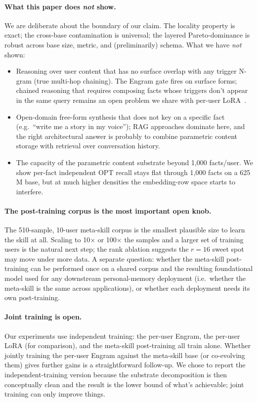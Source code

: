 \documentclass{article}
\begin{document}
\paragraph{What this paper does \emph{not} show.}
We are deliberate about the boundary of our claim. The locality
property is exact; the cross-base contamination is universal; the
layered Pareto-dominance is robust across base size, metric, and
(preliminarily) schema. What we have \emph{not} shown:
\begin{itemize}[leftmargin=*,topsep=2pt,itemsep=2pt]
  \item Reasoning over user content that has no surface overlap with
        any trigger N-gram (true multi-hop chaining). The Engram gate
        fires on surface forms; chained reasoning that requires
        composing facts whose triggers don't appear in the same query
        remains an open problem we share with per-user
        LoRA~\citep{su2024prag}.
  \item Open-domain free-form synthesis that does not key on a
        specific fact (e.g.\ ``write me a story in my voice''); RAG
        approaches dominate here, and the right architectural answer
        is probably to combine parametric content storage with
        retrieval over conversation history.
  \item The capacity of the parametric content substrate beyond 1{,}000
        facts/user. We show per-fact independent OPT recall stays flat
        through 1{,}000 facts on a 625\,M base, but at much higher
        densities the embedding-row space starts to interfere.
\end{itemize}

\paragraph{The post-training corpus is the most important open knob.}
The 510-sample, 10-user meta-skill corpus is the smallest plausible
size to learn the skill at all. Scaling to 10$\times$ or 100$\times$
the samples and a larger set of training users is the natural next
step; the rank ablation suggests the $r{=}16$ sweet spot may move
under more data. A separate question: whether the meta-skill
post-training can be performed once on a shared corpus and the
resulting foundational model used for any downstream personal-memory
deployment (i.e.\ whether the meta-skill is the same across
applications), or whether each deployment needs its own post-training.

\paragraph{Joint training is open.}
Our experiments use independent training: the per-user Engram, the
per-user LoRA (for comparison), and the meta-skill post-training all
train alone. Whether jointly training the per-user Engram against the
meta-skill base (or co-evolving them) gives further gains is a
straightforward follow-up. We chose to report the independent-training
version because the substrate decomposition is then conceptually clean
and the result is the lower bound of what's achievable; joint training
can only improve things.
\end{document}
